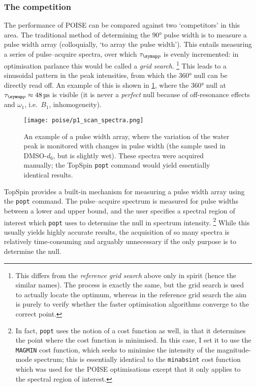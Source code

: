 \subsubsection{The competition}

The performance of POISE can be compared against two `competitors' in this area.
The traditional method of determining the \ang{90} pulse width is to measure a pulse width array (colloquially, `to array the pulse width').\autocite{Keifer1999CMR}
This entails measuring a series of pulse--acquire spectra, over which $\taup$ is evenly incremented: in optimisation parlance this would be called a \textit{grid search}.%
\footnote{This differs from the \textit{reference grid search} above only in spirit (hence the similar names). The process is exactly the same, but the grid search is used to actually locate the optimum, whereas in the reference grid search the aim is purely to verify whether the faster optimisation algorithms converge to the correct point.}
This leads to a sinusoidal pattern in the peak intensities, from which the \ang{360} null can be directly read off.
An example of this is shown in \cref{fig:p1_scan_spectra}, where the \ang{360} null at $\taup \approx \qty{48}{\us}$ is visible (it is never a \textit{perfect} null because of off-resonance effects and $\omega_1$, i.e.\ $B_1$, inhomogeneity).

\begin{figure}[htb]
    \centering
    \texttt{[image: poise/p1\_scan\_spectra.png]}%
    \caption[Pulse width array]{
        An example of a pulse width array, where the variation of the water peak is monitored with changes in pulse width (the sample used in DMSO-$d_6$, but is slightly wet).
        These spectra were acquired manually; the TopSpin \texttt{popt} command would yield essentially identical results.
    }
    \label{fig:p1_scan_spectra}
\end{figure}

TopSpin provides a built-in mechanism for measuring a pulse width array using the \texttt{popt} command.
The pulse--acquire spectrum is measured for pulse widths between a lower and upper bound, and the user specifies a spectral region of interest which \texttt{popt} uses to determine the null in spectrum intensity.%
\footnote{In fact, \texttt{popt} uses the notion of a cost function as well, in that it determines the point where the cost function is minimised. In this case, I set it to use the \texttt{MAGMIN} cost function, which seeks to minimise the intensity of the magnitude-mode spectrum; this is essentially identical to the \texttt{minabsint} cost function which was used for the POISE optimisations except that it only applies to the spectral region of interest.}
While this usually yields highly accurate results, the acquisition of so many spectra is relatively time-consuming and arguably unnecessary if the only purpose is to determine the null.

